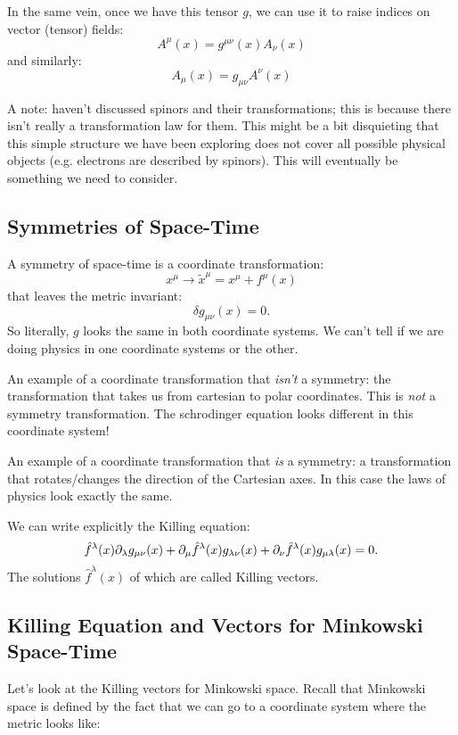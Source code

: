 In the same vein, once we have this tensor $g$, we can use it to raise indices on vector (tensor) fields:
\begin{equation}
    A^\mu(x) = g^{\mu\nu}(x)A_\nu(x)
\end{equation}
and similarly:
\begin{equation}
    A_\mu(x) = g_{\mu\nu}A^{\nu}(x)
\end{equation}

A note: haven't discussed spinors and their transformations; this is because there isn't really a transformation law for them. This might be a bit disquieting that this simple structure we have been exploring does not cover all possible physical objects (e.g. electrons are described by spinors). This will eventually be something we need to consider.

\subsection{Symmetries of Space-Time}
A symmetry of space-time is a coordinate transformation:
\begin{equation}
    x^\mu \to \tilde{x}^\mu = x^\mu + f^\mu(x)
\end{equation}
that leaves the metric invariant:
\begin{equation}
    \delta g_{\mu\nu}(x) = 0.
\end{equation}
So literally, $g$ looks the same in both coordinate systems. We can't tell if we are doing physics in one coordinate systems or the other. 

An example of a coordinate transformation that \emph{isn't} a symmetry: the transformation that takes us from cartesian to polar coordinates. This is \emph{not} a symmetry transformation. The schrodinger equation looks different in this coordinate system!

An example of a coordinate transformation that \emph{is} a symmetry: a transformation that rotates/changes the direction of the Cartesian axes. In this case the laws of physics look exactly the same.

We can write explicitly the Killing equation:
\begin{equation}
    \hat{f}^\lambda(x) \partial_\lambda g_{\mu\nu}(x) + \partial_\mu \hat{f}^\lambda(x) g_{\lambda\nu}(x) + \partial_\nu \hat{f}^\lambda(x) g_{\mu\lambda}(x) = 0.
\end{equation}
The solutions $\hat{f}^\lambda(x)$ of which are called Killing vectors.

\subsection{Killing Equation and Vectors for Minkowski Space-Time}
Let's look at the Killing vectors for Minkowski space. Recall that Minkowski space is defined by the fact that we can go to a coordinate system where the metric looks like:

